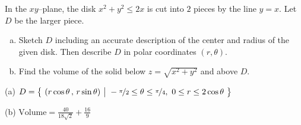 \begin{question}[M200 2014D] %
In the $xy$--plane, the disk $x^2 + y^2 \le 2x$ is cut into $2$ pieces 
by the line $y = x$. Let $D$ be the larger piece.
\begin{enumerate}[(a)]
\item
Sketch $D$ including an accurate description of the center and radius 
of the given disk. Then describe $D$ in polar coordinates $(r, \theta)$.
\item
Find the volume of the solid below $z = \sqrt{x^2 + y^2}$ and above $D$.
\end{enumerate}
\end{question}

%

\begin{answer}
(a) $D = \big\{ \ (r\cos\theta\,,\,r\sin\theta)\ \big|\ -\nicefrac{\pi}{2}\le\theta\le\nicefrac{\pi}{4},\ 0\le r\le 2\cos\theta\ \big\}$

(b) $\text{Volume}=\frac{40}{18\sqrt{2}} +\frac{16}{9}$
\end{answer}

